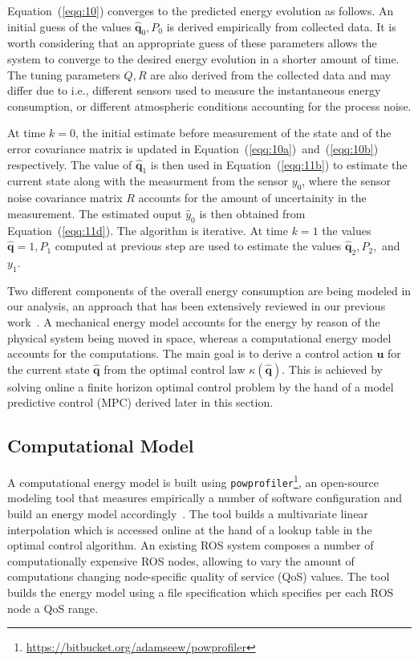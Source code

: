 \documentclass[letterpaper,10pt,conference]{ieeeconf}
\newcommand{\stt}[1]{{\small\tt #1}} %
\newcommand{\powprof}{\stt{powprofiler}}
\begin{document}
Equation~(\ref{eqq:10}) converges to the predicted energy evolution as follows. An initial guess of the values $\hat{\mathbf{q}}_0,P_0$ is derived empirically from collected data. It is worth considering that an appropriate guess of these parameters allows the system to converge to the desired energy evolution in a shorter amount of time. The tuning parameters $Q,R$ are also derived from the collected data and may differ due to i.e., different sensors used to measure the instantaneous energy consumption, or different atmospheric conditions accounting for the process noise.

At time $k=0$, the initial estimate before measurement of the state and of the error covariance matrix is updated in Equation~(\ref{eqq:10a})~and~(\ref{eqq:10b}) respectively. The value of $\hat{\mathbf{q}}_1$ is then used in Equation~(\ref{eqq:11b}) to estimate the current state along with the measurment from the sensor $y_0$, where the sensor noise covariance matrix $R$ accounts for the amount of uncertainity in the measurement. The estimated ouput $\hat{y}_0$ is then obtained from Equation~(\ref{eqq:11d}). The algorithm is iterative. At time $k=1$ the values $\hat{\mathbf{q}}=1,P_1$ computed at previous step are used to estimate the values $\hat{\mathbf{q}}_2,P_2,$ and $y_1$.

Two different components of the overall energy consumption are being modeled in our analysis, an approach that has been extensively reviewed in our previous work~\cite{seewald2019coarse, seewald2019component, seewald2020mechanical, seewald2020towards}. A mechanical energy model accounts for the energy by reason of the physical system being moved in space, whereas a computational energy model accounts for the computations. The main goal is to derive a control action $\mathbf{u}$ for the current state $\hat{\mathbf{q}}$ from the optimal control law $\kappa(\hat{\mathbf{q}})$. This is achieved by solving online a finite horizon optimal control problem by the hand of a model predictive control (MPC) derived later in this section.

\subsection{Computational Model}

A computational energy model is built using \powprof{}\footnote{\label{cross-ref:powprof-link}\url{https://bitbucket.org/adamseew/powprofiler}}, an open-source modeling tool that measures empirically a number of software configuration and build an energy model accordingly~\cite{seewald2019coarse}. The tool builds a multivariate linear interpolation which is accessed online at the hand of a lookup table in the optimal control algorithm. An existing ROS system composes a number of computationally expensive ROS nodes, allowing to vary the amount of computations changing node-specific quality of service (QoS) values. The tool builds the energy model using a file specification which specifies per each ROS node a QoS range.
\end{document}
